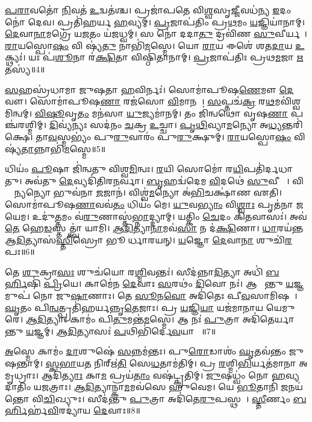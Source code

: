 \ul{𑌪}\ul{𑌰𑌾}𑌵𑌤𑍋॑ \ul{𑌨𑌿}𑌵𑌤॑ \ul{𑌉}𑌦𑍍𑌵𑌤॑𑌶𑍍𑌚।
𑌪𑍍𑌰𑌜𑌾॑𑌪𑌤𑍇 𑌵𑌿\ul{𑌶𑍍𑌵}𑌸𑍃\ul{𑌜𑍍𑌜𑍀}𑌵𑌧॑𑌨𑍍𑌯 \ul{𑌇}𑌦𑌂 𑌨𑍋॑ 𑌦𑍇𑌵।
𑌪𑍍𑌰𑌤𑌿॑\-𑌹𑌰𑍍𑌯 \ul{𑌹}𑌵𑍍𑌯𑌮𑍍।
\ul{𑌪𑍍𑌰}𑌜𑌾𑌪॑𑌤𑌿𑌂 𑌪𑍍𑌰\ul{𑌥}𑌮𑌂 \ul{𑌯}𑌜𑍍𑌞𑌿𑌯𑌾॑𑌨𑌾𑌮𑍍।
\ul{𑌦𑍇}𑌵𑌾\ul{𑌨𑌾}𑌮𑌗𑍍𑌰𑍇॑ 𑌯\ul{𑌜}𑌤𑌂 𑌯॑𑌜𑌧𑍍𑌵𑌮𑍍।
𑌸 𑌨𑍋॑ 𑌦𑌦𑌾\ul{𑌤𑍁} 𑌦𑍍𑌰𑌵𑌿॑𑌣 \ul{𑌸𑍁}𑌵𑍀𑌰𑍍𑌯𑌮𑍍᳚।
\ul{𑌰𑌾}𑌯𑌸𑍍𑌪𑍋\ul{𑌷𑌂} 𑌵𑌿 𑌷𑍍𑌯॑\ul{𑌤𑍁} 𑌨𑌾𑌭𑌿॑\ul{𑌮}𑌸𑍍𑌮𑍇।
𑌯𑍋 \ul{𑌰𑌾}𑌯 𑌈𑌶𑍇॑ 𑌶𑌤\ul{𑌦𑌾}𑌯 \ul{𑌉}𑌕𑍍𑌥𑍍𑌯𑌃॑।
𑌯𑌃 𑌪॑\ul{𑌶𑍂}𑌨𑌾 𑌰॑\ul{𑌕𑍍𑌷𑌿}𑌤𑌾 𑌵𑌿𑌷𑍍𑌠𑌿॑𑌤𑌾𑌨𑌾𑌮𑍍।
\ul{𑌪𑍍𑌰}𑌜𑌾𑌪॑𑌤𑌿𑌃 𑌪𑍍𑌰𑌥\ul{𑌮}𑌜𑌾 \ul{𑌋}𑌤𑌸𑍍𑌯॑॥4॥

\ul{𑌸}𑌹𑌸𑍍𑌰॑𑌧𑌾𑌮𑌾 𑌜𑍁𑌷𑌤𑌾 \ul{𑌹}𑌵𑌿𑌰𑍍𑌨𑌃॑।
𑌸𑍋𑌮𑌾॑𑌪𑍂𑌷\ul{𑌣𑍇}𑌮𑍗 \ul{𑌦𑍇}𑌵𑍗।
𑌸𑍋𑌮𑌾॑𑌪𑍂𑌷\ul{𑌣𑌾} 𑌰𑌜॑𑌸𑍋 \ul{𑌵𑌿}𑌮𑌾𑌨𑌮𑍍᳚।
\ul{𑌸}𑌪𑍍𑌤𑌚॑\ul{𑌕𑍍𑌰}\ul{} 𑌰\ul{𑌥}𑌮𑌵𑌿॑𑌶𑍍𑌵𑌮𑌿𑌨𑍍𑌵𑌮𑍍।
\ul{𑌵𑌿}\ul{𑌷𑍂}𑌵𑍃\ul{𑌤𑌂} 𑌮𑌨॑𑌸𑌾 \ul{𑌯𑍁}𑌜𑍍𑌯𑌮𑌾॑𑌨𑌮𑍍।
𑌤𑌂 𑌜𑌿॑𑌨𑍍𑌵𑌥𑍋 𑌵𑍃𑌷\ul{𑌣𑌾} 𑌪𑌞𑍍𑌚॑𑌰𑌶𑍍𑌮𑌿𑌮𑍍।
\ul{𑌦𑌿}𑌵𑍍𑌯॑𑌨𑍍𑌯𑌃 𑌸𑌦॑𑌨𑌂 \ul{𑌚}𑌕𑍍𑌰 \ul{𑌉}𑌚𑍍𑌚𑌾।
\ul{𑌪𑍃}\ul{𑌥𑌿}𑌵𑍍𑌯𑌾\ul{𑌮}𑌨𑍍𑌯𑍋 𑌅\ul{𑌧𑍍𑌯}𑌨𑍍𑌤𑌰𑌿॑𑌕𑍍𑌷𑍇।
𑌤𑌾\ul{𑌵}𑌸𑍍𑌮𑌭𑍍𑌯𑌂॑ 𑌪𑍁\ul{𑌰𑍁}𑌵𑌾𑌰𑌂॑ 𑌪𑍁\ul{𑌰𑍁}𑌕𑍍𑌷𑍁𑌮𑍍।
\ul{𑌰𑌾}𑌯𑌸𑍍𑌪𑍋\ul{𑌷𑌂} 𑌵𑌿𑌷𑍍𑌯॑\ul{𑌤𑌾}𑌨𑍍𑌨𑌾𑌭𑌿॑\ul{𑌮}𑌸𑍍𑌮𑍇॥5॥

𑌧𑌿𑌯𑌂॑ \ul{𑌪𑍂}𑌷𑌾 𑌜𑌿॑𑌨𑍍𑌵𑌤𑍁 𑌵𑌿𑌶𑍍𑌵\ul{𑌮𑌿}𑌨𑍍𑌵𑌃।
\ul{𑌰}𑌯𑌿 𑌸𑍋𑌮𑍋॑ 𑌰\ul{𑌯𑌿}𑌪𑌤𑌿॑𑌰𑍍𑌦𑌧𑌾𑌤𑍁।
𑌅𑌵॑𑌤𑍁 \ul{𑌦𑍇}𑌵𑍍𑌯𑌦𑌿॑𑌤𑌿𑌰\ul{𑌨}𑌰𑍍𑌵𑌾।
\ul{𑌬𑍃}𑌹𑌦𑍍𑌵॑𑌦𑍇𑌮 \ul{𑌵𑌿}𑌦𑌥𑍇॑ \ul{𑌸𑍁}𑌵𑍀𑌰𑌾𑌃᳚।
𑌵𑌿𑌶𑍍𑌵𑌾᳚\ul{𑌨𑍍𑌯}𑌨𑍍𑌯𑍋 𑌭𑍁𑌵॑𑌨𑌾 \ul{𑌜}𑌜𑌾𑌨॑।
𑌵𑌿𑌶𑍍𑌵॑\ul{𑌮}𑌨𑍍𑌯𑍋 𑌅॑\ul{𑌭𑌿}𑌚𑌕𑍍𑌷𑌾॑𑌣 𑌏𑌤𑌿।
𑌸𑍋𑌮𑌾॑𑌪𑍂𑌷\ul{𑌣𑌾}𑌵𑌵॑\ul{𑌤𑌂} 𑌧𑌿𑌯𑌂॑ 𑌮𑍇।
\ul{𑌯𑍁}𑌵\ul{𑌭𑍍𑌯𑌾𑌂} 𑌵𑌿\ul{𑌶𑍍𑌵𑌾𑌃} 𑌪𑍃𑌤॑𑌨𑌾 𑌜𑌯𑍇𑌮।
𑌉𑌦𑍁॑\ul{𑌤𑍍𑌤}𑌮𑌂 𑌵॑\ul{𑌰𑍁}𑌣𑌾𑌸𑍍𑌤॑\ul{𑌭𑍍𑌨𑌾}𑌦𑍍𑌦𑍍𑌯𑌾𑌮𑍍।
𑌯𑌤𑍍𑌕𑌿𑌂 \ul{𑌚𑍇}𑌦𑌂 𑌕𑌿॑\ul{𑌤}𑌵𑌾𑌸𑌃॑।
𑌅𑌵॑ \ul{𑌤𑍇} 𑌹𑍇\ul{𑌡}𑌸𑍍𑌤𑌤𑍍𑌤𑍍𑌵𑌾॑ 𑌯𑌾𑌮𑌿।
\ul{𑌆}\ul{𑌦𑌿}𑌤𑍍𑌯𑌾\ul{𑌨𑌾}𑌮𑌵॑\ul{𑌸𑌾} 𑌨 𑌦॑\ul{𑌕𑍍𑌷𑌿}𑌣𑌾।
\ul{𑌧𑌾}𑌰𑌯॑𑌨𑍍𑌤 𑌆\ul{𑌦𑌿}𑌤𑍍𑌯𑌾𑌸॑\ul{𑌸𑍍𑌤𑌿}𑌸𑍍𑌰𑍋 𑌭𑍂𑌮𑍀᳚𑌰𑍍𑌧𑌾𑌰𑌯𑌨𑍍।
\ul{𑌯}𑌜𑍍𑌞𑍋 \ul{𑌦𑍇}𑌵𑌾\ul{𑌨𑌾}\ul{} 𑌶𑍁𑌚𑌿॑\ul{𑌰}𑌪𑌃॥6॥\anuvakamend[\ul{𑌮}\ul{𑌨𑍀}𑌷𑌾\-𑌽𑌸𑍍𑌤𑍁॑ \ul{𑌚}𑌰𑍍𑌤\ul{𑌸𑍍𑌯𑌾}𑌸𑍍𑌮𑍇 𑌕𑌿॑\ul{𑌤}𑌵𑌾𑌸॑\ul{𑌶𑍍𑌚}𑌤𑍍𑌵𑌾𑌰𑌿॑ 𑌚]

𑌤𑍇 \ul{𑌶𑍁}𑌕𑍍𑌰𑌾\ul{𑌸𑌃} 𑌶𑍁𑌚॑𑌯𑍋 𑌰\ul{𑌶𑍍𑌮𑌿}𑌵𑌨𑍍𑌤𑌃॑।
𑌸𑍀𑌦॑𑌨𑍍𑌨𑌾\ul{𑌦𑌿}𑌤𑍍𑌯𑌾 𑌅𑌧𑌿॑ \ul{𑌬}\ul{𑌰𑍍}𑌹𑌿𑌷𑌿॑ \ul{𑌪𑍍𑌰𑌿}𑌯𑍇।
𑌕𑌾𑌮𑍇॑𑌨 \ul{𑌦𑍇}𑌵𑌾𑌃 \ul{𑌸}𑌰𑌥𑌂॑ \ul{𑌦𑌿}𑌵𑍋 𑌨𑌃॑।
𑌆 𑌯𑌾᳚𑌨𑍍𑌤𑍁 \ul{𑌯}𑌜𑍍𑌞𑌮𑍁𑌪॑ 𑌨𑍋 𑌜𑍁\ul{𑌷𑌾}𑌣𑌾𑌃।
𑌤𑍇 \ul{𑌸𑍂}𑌨\ul{𑌵𑍋} 𑌅𑌦𑌿॑𑌤𑍇𑌃 𑌪𑍀\ul{𑌵}𑌸𑌾𑌮𑌿𑌷𑌮𑍍᳚।
\ul{𑌘𑍃}𑌤𑌂 𑌪𑌿\ul{𑌨𑍍𑌵}𑌤𑍍𑌪𑍍𑌰𑌤𑌿॑\-𑌹𑌰𑍍𑌯𑌨𑍍𑌨𑍃\ul{𑌤𑍇}𑌜𑌾𑌃।
𑌪𑍍𑌰 \ul{𑌯}𑌜𑍍𑌞𑌿\ul{𑌯𑌾} 𑌯𑌜॑𑌮𑌾𑌨𑌾𑌯 𑌯𑍇𑌮𑍁𑌰𑍇।
\ul{𑌆}\ul{𑌦𑌿}𑌤𑍍𑌯𑌾𑌃 𑌕𑌾𑌮𑌂॑ 𑌪𑌿\ul{𑌤𑍁}𑌮𑌨𑍍𑌤॑\ul{𑌮}𑌸𑍍𑌮𑍇।
𑌆 𑌨𑌃॑ \ul{𑌪𑍁}𑌤𑍍𑌰𑌾 𑌅𑌦𑌿॑𑌤𑍇𑌰𑍍𑌯𑌾𑌨𑍍𑌤𑍁 \ul{𑌯}𑌜𑍍𑌞𑌮𑍍।
\ul{𑌆}\ul{𑌦𑌿}𑌤𑍍𑌯𑌾𑌸𑌃॑ \ul{𑌪}𑌥𑌿𑌭𑌿॑𑌰𑍍𑌦𑍇\ul{𑌵}𑌯𑌾𑌨𑍈𑌃᳚॥7॥

\ul{𑌅}𑌸𑍍𑌮𑍇 𑌕𑌾𑌮𑌂॑ \ul{𑌦𑌾}𑌶𑍁𑌷𑍇॑ \ul{𑌸}𑌨𑍍𑌨𑌮॑𑌨𑍍𑌤𑌃।
𑌪𑍁\ul{𑌰𑍋}𑌡𑌾𑌶𑌂॑ \ul{𑌘𑍃}𑌤𑌵॑𑌨𑍍𑌤𑌂 𑌜𑍁𑌷𑌨𑍍𑌤𑌾𑌮𑍍।
\ul{𑌸𑍍𑌕}\ul{𑌭𑌾}𑌯\ul{𑌤} 𑌨𑌿𑌰𑍍\mbox{}𑌋॑\ul{𑌤𑌿}\ul{} 𑌸𑍇\ul{𑌧}𑌤𑌾𑌮॑𑌤𑌿𑌮𑍍।
𑌪𑍍𑌰 \ul{𑌰}𑌶𑍍𑌮𑌿\ul{𑌭𑌿}𑌰𑍍𑌯𑌤॑𑌮𑌾𑌨𑌾 𑌅𑌮𑍃𑌧𑍍𑌰𑌾𑌃।
𑌆𑌦𑌿॑\ul{𑌤𑍍𑌯𑌾𑌃} 𑌕𑌾\ul{𑌮} 𑌪𑍍𑌰𑌯॑\ul{𑌤𑌾𑌂} 𑌵𑌷॑𑌟𑍍𑌕𑍃𑌤𑌿𑌮𑍍।
\ul{𑌜𑍁}𑌷𑌧𑍍𑌵𑌂॑ 𑌨𑍋 \ul{𑌹}𑌵𑍍𑌯𑌦𑌾॑𑌤𑌿𑌂 𑌯𑌜𑌤𑍍𑌰𑌾𑌃।
\ul{𑌆}\ul{𑌦𑌿}𑌤𑍍𑌯𑌾𑌨𑍍𑌕𑌾\ul{𑌮}𑌮𑌵॑𑌸𑍇 𑌹𑍁𑌵𑍇𑌮।
𑌯𑍇 \ul{𑌭𑍂}𑌤𑌾𑌨𑌿॑ \ul{𑌜}𑌨𑌯॑𑌨𑍍𑌤𑍋 𑌵𑌿\ul{𑌚𑌿}𑌖𑍍𑌯𑍁𑌃।
𑌸𑍀𑌦॑𑌨𑍍𑌤𑍁 \ul{𑌪𑍁}𑌤𑍍𑌰𑌾 𑌅𑌦𑌿॑𑌤𑍇\ul{𑌰𑍁}𑌪𑌸𑍍𑌥𑌮𑍍᳚।
\ul{𑌸𑍍𑌤𑍀}𑌰𑍍𑌣𑌂 \ul{𑌬}\ul{𑌰𑍍}𑌹𑌿𑌰𑍍\mbox{}𑌹॑\ul{𑌵𑌿}𑌰𑌦𑍍𑌯𑌾॑𑌯 \ul{𑌦𑍇}𑌵𑌾𑌃॥8॥


